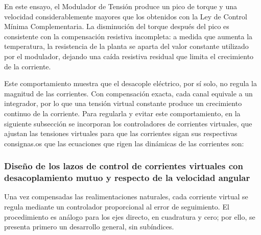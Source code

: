 \documentclass[blue,fullpaper]{ludusofficial}  %
\begin{document}
En este ensayo, el Modulador de Tensión produce un pico de torque
y una velocidad considerablemente mayores que los obtenidos
con la Ley de Control Mínima Complementaria. La disminución
del torque después del pico es consistente con la compensación
resistiva incompleta: a medida que aumenta la temperatura,
la resistencia de la planta se aparta del valor constante
utilizado por el modulador, dejando una caída resistiva residual
que limita el crecimiento de la corriente.

Este comportamiento muestra que el desacople eléctrico,
por sí solo, no regula la magnitud de las corrientes. Con
compensación exacta, cada canal equivale a un integrador,
por lo que una tensión virtual constante produce un crecimiento
continuo de la corriente. Para regularla y evitar este
comportamiento, en la siguiente subsección se incorporan los
controladores de corrientes virtuales, que ajustan las tensiones
virtuales para que las corrientes sigan sus respectivas consignas.os que las ecuaciones que rigen las dinámicas de las corrientes son:






\subsubsection{Diseño de los lazos de control de corrientes virtuales con desacoplamiento mutuo y respecto de la velocidad angular}

Una vez compensadas las realimentaciones naturales, cada corriente virtual se regula mediante un controlador proporcional al error de seguimiento. El procedimiento es análogo para los ejes directo, en cuadratura y cero; por ello, se presenta primero un desarrollo general, sin subíndices.
\end{document}
